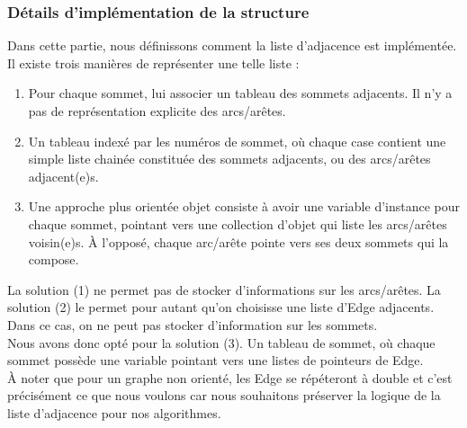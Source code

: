 \documentclass[french]{article}
\begin{document}
			\subsubsection{Détails d'implémentation de la structure}
			Dans cette partie, nous définissons comment la liste d'adjacence est implémentée. Il existe trois manières de représenter une telle liste :
			\begin{enumerate}
				\item Pour chaque sommet, lui associer un tableau des sommets adjacents. Il n'y a pas de représentation explicite des arcs/arêtes.
				\item Un tableau indexé par les numéros de sommet, où chaque case contient une simple liste chainée constituée des sommets adjacents, ou des arcs/arêtes adjacent(e)s.
				\item Une approche plus orientée objet consiste à avoir une variable d'instance pour chaque sommet, pointant vers une collection d'objet qui liste les arcs/arêtes voisin(e)s. À l'opposé, chaque arc/arête pointe vers ses deux sommets qui la compose. 
			\end{enumerate}
			La solution (1) ne permet pas de stocker d'informations sur les arcs/arêtes. La solution (2) le permet pour autant qu'on choisisse une liste d'Edge adjacents. Dans ce cas, on ne peut pas stocker d'information sur les sommets.\\
			
			Nous avons donc opté pour la solution (3). Un tableau de sommet, où chaque sommet possède une variable pointant vers une listes de pointeurs de Edge.\\
			À noter que pour un graphe non orienté, les Edge se répéteront à double et c'est précisément ce que nous voulons car nous souhaitons préserver la logique de la liste d'adjacence pour nos algorithmes.\\
			
\end{document}
